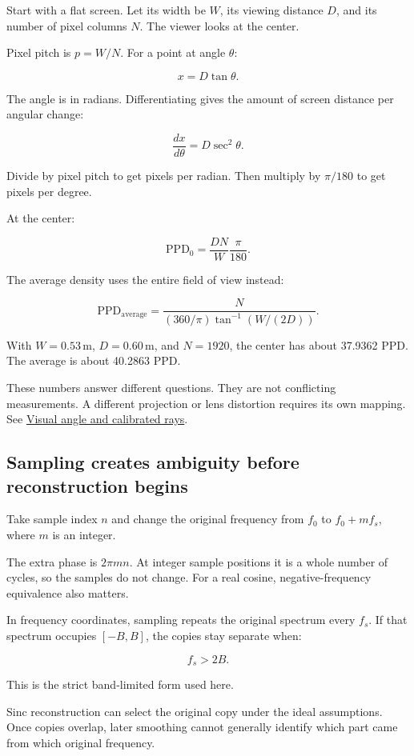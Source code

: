 Start with a flat screen. Let its width be \(W\), its viewing distance \(D\), and its number of pixel columns \(N\). The viewer looks at the center.

Pixel pitch is \(p=W/N\). For a point at angle \(\theta\):

\[
x=D\tan\theta.
\]

The angle is in radians. Differentiating gives the amount of screen distance per angular change:

\[
\frac{dx}{d\theta}=D\sec^2\theta.
\]

Divide by pixel pitch to get pixels per radian. Then multiply by \(\pi/180\) to get pixels per degree.

At the center:

\[
\mathrm{PPD}_0=\frac{DN}{W}\frac{\pi}{180}.
\]

The average density uses the entire field of view instead:

\[
\mathrm{PPD}_{\mathrm{average}}
=\frac{N}{(360/\pi)\tan^{-1}(W/(2D))}.
\]

With \(W=0.53\,\mathrm{m}\), \(D=0.60\,\mathrm{m}\), and \(N=1920\), the center has about 37.9362 PPD. The average is about 40.2863 PPD.

These numbers answer different questions. They are not conflicting measurements. A different projection or lens distortion requires its own mapping. See \hyperref[appendix-7d356c396d1a]{Visual angle and calibrated rays}.

\subsection{Sampling creates ambiguity before reconstruction begins}\label{04-visual-computing-ii-ch043-sampling-creates-ambiguity-before-reconstruction-begins}

Take sample index \(n\) and change the original frequency from \(f_0\) to \(f_0+mf_s\), where \(m\) is an integer.

The extra phase is \(2\pi mn\). At integer sample positions it is a whole number of cycles, so the samples do not change. For a real cosine, negative-frequency equivalence also matters.

In frequency coordinates, sampling repeats the original spectrum every \(f_s\). If that spectrum occupies \([-B,B]\), the copies stay separate when:

\[
f_s>2B.
\]

This is the strict band-limited form used here.

Sinc reconstruction can select the original copy under the ideal assumptions. Once copies overlap, later smoothing cannot generally identify which part came from which original frequency.

